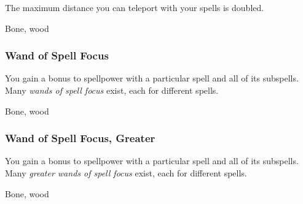 The maximum distance you can teleport with your  spells is doubled.



 


 Bone, wood


\lowercase{\hypertarget{item:Wand of Spell Focus}{}}\label{item:Wand of Spell Focus}
\hypertarget{item:Wand of Spell Focus}{\subsubsection{Wand of Spell Focus\hfill{}}}

You gain a  bonus to spellpower with a particular spell and all of its subspells.
Many \textit{wands of spell focus} exist, each for different spells.



 


 Bone, wood


\lowercase{\hypertarget{item:Wand of Spell Focus, Greater}{}}\label{item:Wand of Spell Focus, Greater}
\hypertarget{item:Wand of Spell Focus, Greater}{\subsubsection{Wand of Spell Focus, Greater\hfill{}}}

You gain a  bonus to spellpower with a particular spell and all of its subspells.
Many \textit{greater wands of spell focus} exist, each for different spells.



 


 Bone, wood
